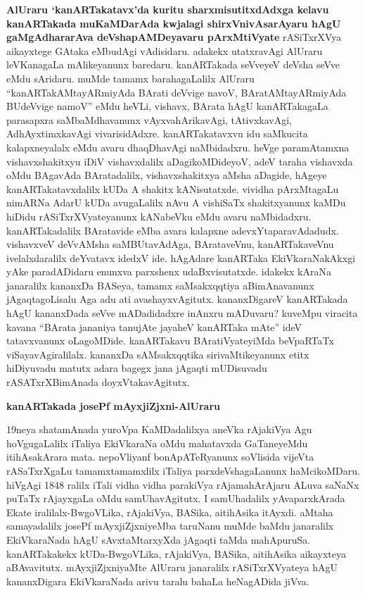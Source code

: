 \documentclass[11pt,a4size]{article}
\begin{document}
\textbf{AlUraru `kanARTakatavx'da kuritu sharxmisutitxdAdxga kelavu
  kanARTakada muKaMDarAda kwjalagi shirxVnivAsarAyaru hAgU
  gaMgAdhararAva deVshapAMDeyavaru pArxMtiVyate} rASiTxrXVya
  aikayxtege GAtaka eMbudAgi vAdisidaru. adakekx utatxravAgi AlUraru
  leVKanagaLa mAlikeyanunx baredaru. kanARTakada seVveyeV deVsha seVve
  eMdu sAridaru. muMde tamamx barahagaLalilx AlUraru
  ``kanARTakAMtayARmiyAda BArati deVvige navoV, BAratAMtayARmiyAda
  BUdeVvige namoV'' eMdu heVLi, vishavx, BArata hAgU kanARTakagaLa
  parasapxra saMbaMdha\-vanunx vAyxvahArikavAgi, tAtivxkavAgi,
  AdhAyxtimxkavAgi vivarisidAdxre. kanARTakatavxvu idu saMkucita
  kalapxneyalalx eMdu avaru dhaqDhavAgi naMbidadxru. heVge
  paramAtamxna vishavxshakitxyu iDiV vishavxdalilx aDagikoMDideyoV,
  adeV taraha vishavxda oMdu BAgavAda BAratadalilx, vishavxshakitxya
  aMsha aDagide, hAgeye kanARTakatavxdalilx kUDa A shakitx
  kANisutatxde. vividha pArxMtagaLu nimARNa AdarU kUDa avugaLalilx
  nAvu A vishiSaTx shakitxyanunx kaMDu hiDidu rASiTxrXVyate\-yanunx
  kANabeVku eMdu avaru naMbidadxru. kanARTakadalilx BAratavide eMba
  avara kalapxne adevxYtaparavAdadudx. vishavxveV deVvAMsha
  saMBUtavAdAga, BArataveVnu, kanARTakaveVnu ivelalxdaralilx deYvatavx
  idedxV ide. hAgAdare kanARTaka EkiVkaraNakAkxgi yAke paradADidaru
  enunxva parxshenx udaBxvisutatxde. idakekx kAraNa janaralilx
  kananxDa BASeya, tamamx saMsakxqqtiya aBimAnavanunx jAgaqtagoLisalu
  Aga adu ati avashayxvAgitutx. kananxDigareV kanARTakada hAgU
  kananxDada seVve mADadidadxre inAnxru mADuvaru? kuveMpu viracita
  kavana ``BArata jananiya tanujAte jayaheV kanARTaka mAte'' ideV
  tatavxvanunx oLagoMDide. kanARTakavu BAratiVyateyiMda beVpaRTaTx
  viSayavAgiralilalx. kananxDa sAMsakxqqtika sirivaMtikeyanunx etitx
  hiDiyuvadu matutx adara bagegx jana jAgaqti mUDisuvadu
  rASATxrXBimAnada doyxVtakavAgitutx.

\bigskip
\centerline{\textbf{\Large{kanARTakada josePf mAyxjiZjxni-AlUraru}}}
\medskip

19neya shatamAnada yuroVpa KaMDadalilxya aneVka rAjakiVya Agu
hoVgugaLalilx iTaliya EkiVkaraNa oMdu mahatavxda GaTaneyeMdu
itihAsakArara mata. nepoVliyanf bonApATeRyanunx soVlisida vijeVta
rASaTxrXgaLu tamamxtamamxlilx iTaliya parxdeVshagaLanunx
haMcikoMDaru. hiVgAgi 1848 ralilx iTali vidha vidha parakiVya
rAjamahArAjaru ALuva saNaNx puTaTx rAjayxgaLa oMdu samUhavAgitutx. I
samUhadalilx yAvaparxkArada Ekate iralilalx-BwgoVLika, rAjakiVya,
BASika, aitihAsika itAyxdi. aMtaha samayadalilx josePf
mAyxjiZjxniyeMba taruNanu muMde baMdu janaralilx EkiVkaraNada hAgU
sAvxtaMtarxyXda jAgaqti taMda mahApuruSa. kanARTakakekx
kUDa-BwgoVLika, rAjakiVya, BASika, aitihAsika aikayxteya
aBAvavitutx. mAyxjiZjxniyaMte AlUraru janaralilx rASiTxrXVyateya hAgU
kananxDigara EkiVkaraNada arivu taralu bahaLa heNagADida jiVva.
\end{document}
